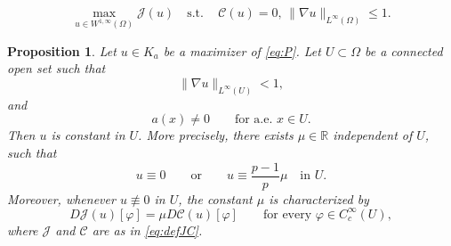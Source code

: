 \documentclass[10pt,a4paper]{amsart}
\newtheorem{proposition}{Proposition}
\begin{document}
\begin{equation}\label{eq:P} \tag{P}  \max_{u \in W^{1,\infty}(\Omega)} \mathcal J(u) \quad \text{s.t.} \,\quad \mathcal{C}(u) = 0, \,   \|\nabla u \|_{L^{\infty}(\Omega)} \leq 1  .
\end{equation}

\begin{proposition}
\label{prop:inactive-region}
Let $u \in K_a$ be a maximizer of \eqref{eq:P}. Let
$U\subset\Omega$ be a connected open set such that
$$
\|\nabla u\|_{L^\infty(U)}<1,
$$
and
$$
a(x)\neq 0
\qquad\text{for a.e. }x\in U.
$$
Then $u$ is constant in $U$. More precisely, there exists
$\mu\in\mathbb R$ independent of $U$, such that
$$u\equiv0
\qquad\text{or}\qquad
u\equiv\frac{p-1}{p}\mu
\quad\text{in }U.$$
Moreover, whenever $u\not\equiv0$ in $U$, the constant $\mu$ is
characterized by
$$
D\mathcal J(u)[\varphi]
=
\mu D\mathcal C(u)[\varphi]
\qquad
\text{for every }\varphi\in C_c^\infty(U),
$$
where $\mathcal J$ and $\mathcal C$ are as in \eqref{eq:defJC}.
\end{proposition}
\end{document}
